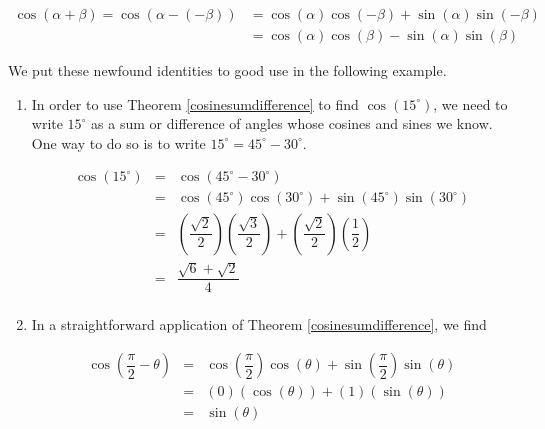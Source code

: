 \begin{align*}
\cos(\alpha + \beta) = \cos(\alpha - (-\beta)) &= \cos(\alpha) \cos(-\beta) + \sin(\alpha) \sin(-\beta)\\
& = \cos(\alpha) \cos(\beta) - \sin(\alpha) \sin(\beta)
\end{align*}

We put these newfound identities to good use in the following example.

\medskip

{\begin{enumerate}

\item In order to use Theorem \ref{cosinesumdifference} to find $\cos\left(15^{\circ}\right)$, we need to write $15^{\circ}$ as a sum or difference of angles whose cosines and sines we know.  One way to do so is to write $15^{\circ} = 45^{\circ} - 30^{\circ}$.


\[ \begin{array}{rcl}

\cos\left(15^{\circ}\right) & = & \cos\left(45^{\circ} - 30^{\circ} \right) \\ [2pt]
                            & = & \cos\left(45^{\circ}\right)\cos\left(30^{\circ} \right) + \sin\left(45^{\circ}\right)\sin\left(30^{\circ} \right) \\ [2pt]
                            & = & \left( \dfrac{\sqrt{2}}{2} \right)\left( \dfrac{\sqrt{3}}{2} \right)  +  \left( \dfrac{\sqrt{2}}{2} \right)\left( \dfrac{1}{2} \right)\\ [15pt]
														& = &  \dfrac{\sqrt{6}+ \sqrt{2}}{4} \\ 
\end{array} \]

\item  In a straightforward application of  Theorem \ref{cosinesumdifference}, we find

\[ \begin{array}{rcl}

\cos\left(\dfrac{\pi}{2} - \theta\right) & = & \cos\left(\dfrac{\pi}{2}\right)\cos\left(\theta\right) + \sin\left(\dfrac{\pi}{2}\right)\sin\left(\theta \right) \\ [10pt]
                            & = & \left( 0 \right)\left( \cos(\theta) \right)  +  \left( 1 \right)\left( \sin(\theta) \right) \\ [4pt]
														& = & \sin(\theta)    \\
\end{array} \]


\end{enumerate}
}

